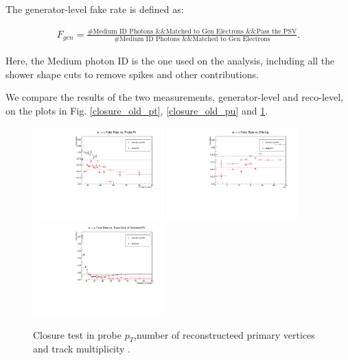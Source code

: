 The generator-level fake rate is defined as:

\begin{eqnarray}
F_{gen} = \frac{\textrm{\#Medium ID Photons \&\& Matched to Gen Electrons \&\& Pass the PSV}}{\textrm{\#Medium ID Photons \&\& Matched to Gen Electrons}}. \label{gen_fake}
\end{eqnarray}

Here, the Medium photon ID is the one used on the analysis, including all the shower shape cuts to remove spikes and other contributions.

We compare the results of the two measurements, generator-level and reco-level, on the plots in Fig. \ref{closure_old_pt}, \ref{closure_old_pu} and \ref{closure_old_ntrk}.

\begin{figure}[H]
\begin{center}
{\label{closure_old_pt}\includegraphics[width=0.45\textwidth]{efake_figs/closure_old_pt.pdf}}
{\label{closure_old_pu}\includegraphics[width=0.45\textwidth]{efake_figs/closure_old_pu.pdf}}
\\
{\label{closure_old_ntrk}\includegraphics[width=0.45\textwidth]{efake_figs/closure_old_trk.pdf}}
\caption{Closure test in probe $p_T$,number of reconstructeed primary vertices and track multiplicity .}
\end{center}
\end{figure}
%

